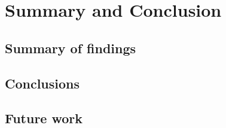 \chapter{Summary and Conclusion}\label{chapter:summary_conclusion}
\section{Summary of findings}\label{section:summary_findings}


\section{Conclusions}\label{section:conclusions}


\section{Future work}\label{section:future_work}


